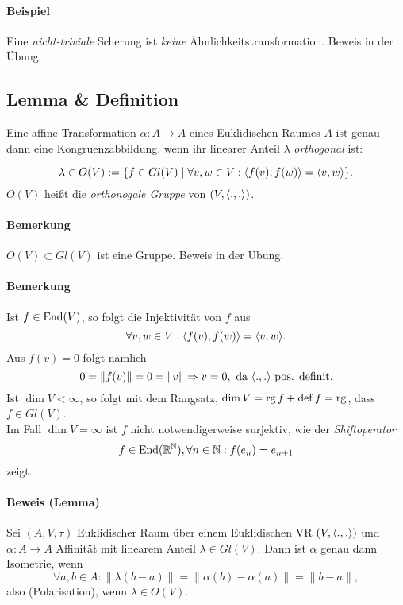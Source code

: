 \paragraph{Beispiel}
	Eine \emph{nicht-triviale} Scherung ist \emph{keine} Ähnlichkeitstransformation. Beweis in der Übung. %

\subsection{Lemma \& Definition}
\begin{Lemma}
	Eine affine Transformation $ \alpha:A\to A $ eines Euklidischen Raumes $ A $ ist genau dann eine Kongruenzabbildung, wenn ihr linearer Anteil $ \lambda $ \emph{orthogonal} ist:
\end{Lemma}
\begin{Definition}
		\[ \lambda\in O(V):= \{f\in Gl(V)\mid \forall v,w\in V: \langle f(v),f(w) \rangle = \langle v,w \rangle\}. \]
	$ O(V) $ heißt die \emph{orthonogale Gruppe} von $ (V,\langle .,. \rangle) $.
\end{Definition}

\paragraph{Bemerkung}
	$ O(V)\subset Gl(V) $ ist eine Gruppe. Beweis in der Übung.
\paragraph{Bemerkung}
	Ist $ f\in \operatorname{End}(V) $, so folgt die Injektivität von $ f $ aus
		\[ \forall v,w\in V: \langle f(v),f(w) \rangle = \langle v,w \rangle. \]
	Aus $ f(v) = 0 $ folgt nämlich
		\[ 0 = \|f(v)\| = 0 = \|v\| \Rightarrow v = 0, \text{ da } \langle .,. \rangle\text{ pos. definit.} \]
	Ist $ \dim V <\infty $, so folgt mit dem Rangsatz, $ \dim V = \operatorname{rg} f + \operatorname{def} f = \operatorname{rg} $, dass $ f\in Gl(V) $.\\
	Im Fall $ \dim V = \infty $ ist $ f $ nicht notwendigerweise surjektiv, wie der \emph{Shiftoperator}
		\[ f\in \operatorname{End}(\mathbb{R}^{\mathbb{N}}), \forall n\in \mathbb{N}: f(e_n) = e_{n+1} \]
	zeigt.
\paragraph{Beweis (Lemma)}
	Sei $ (A,V,\tau) $ Euklidischer Raum über einem Euklidischen VR $ (V,\langle .,. \rangle) $ und $\alpha:A\to A $ Affinität mit linearem Anteil $ \lambda\in Gl(V) $. Dann ist $ \alpha $ genau dann Isometrie, wenn
		\[ \forall a,b\in A: \|\lambda(b-a)\| = \|\alpha(b)-\alpha(a)\| = \|b-a\|,  \]
	also (Polarisation), wenn $ \lambda\in O(V) $.
